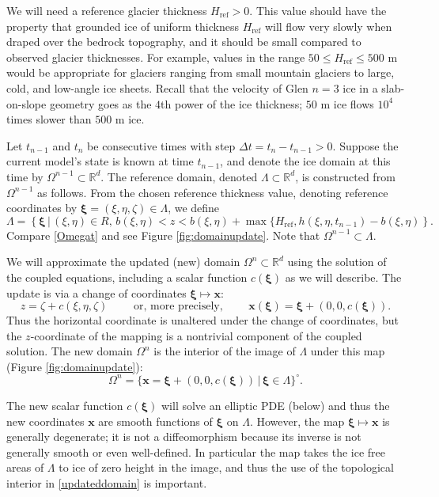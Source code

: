 \documentclass[letterpaper,final,12pt,reqno]{amsart}
\newcommand{\RR}{\mathbb{R}}
\newcommand{\bx}{\mathbf{x}}
\newcommand{\bxi}{\bm{\xi}}
\newcommand{\Href}{H_{\text{ref}}}
\begin{document}
We will need a reference glacier thickness $\Href>0$.  This value should have the property that grounded ice of uniform thickness $\Href$ will flow very slowly when draped over the bedrock topography, and it should be small compared to observed glacier thicknesses.  For example, values in the range $50 \le \Href \le 500$ m would be appropriate for glaciers ranging from small mountain glaciers to large, cold, and low-angle ice sheets.  Recall that the velocity of Glen $n=3$ ice in a slab-on-slope geometry \cite{GreveBlatter2009} goes as the $4$th power of the ice thickness; $50$ m ice flows $10^4$ times slower than $500$ m ice.

Let $t_{n-1}$ and $t_n$ be consecutive times with step $\Delta t = t_n - t_{n-1} > 0$.  Suppose the current model's state is known at time $t_{n-1}$, and denote the ice domain at this time by $\Omega^{n-1} \subset \RR^d$.  The reference domain, denoted $\Lambda \subset \RR^d$, is constructed from $\Omega^{n-1}$ as follows.  From the chosen reference thickness value, denoting reference coordinates by $\bxi=(\xi,\eta,\zeta) \in \Lambda$, we define
\begin{equation}
\Lambda = \left\{\bxi\,\big|\,(\xi,\eta)\in R, \, b(\xi,\eta) < z < b(\xi,\eta) + \max\{\Href,h(\xi,\eta,t_{n-1})-b(\xi,\eta)\right\}.  \label{Lambda}
\end{equation}
Compare \eqref{Omegat} and see Figure \ref{fig:domainupdate}.  Note that $\Omega^{n-1} \subset \Lambda$.

We will approximate the updated (new) domain $\Omega^n \subset \RR^d$ using the solution of the coupled equations, including a scalar function $c(\bxi)$ as we will describe.  The update is via a change of coordinates $\bxi \mapsto \bx$:
\begin{equation}
z=\zeta+c(\xi,\eta,\zeta) \qquad \text{ or, more precisely, } \qquad \bx(\bxi) = \bxi + (0,0,c(\bxi)). \label{changecoords}
\end{equation}
Thus the horizontal coordinate is unaltered under the change of coordinates, but the $z$-coordinate of the mapping is a nontrivial component of the coupled solution.  The new domain $\Omega^n$ is the interior of the image of $\Lambda$ under this map (Figure \ref{fig:domainupdate}):
\begin{equation}
\Omega^n = \{\bx=\bxi + (0,0,c(\bxi)) \,\big|\, \bxi \in \Lambda\}^\circ. \label{updateddomain}
\end{equation}

The new scalar function $c(\bxi)$ will solve an elliptic PDE (below) and thus the new coordinates $\bx$ are smooth functions of $\bxi$ on $\Lambda$.  However, the map $\bxi \mapsto \bx$ is generally degenerate; it is not a diffeomorphism because its inverse is not generally smooth or even well-defined.  In particular the map takes the ice free areas of $\Lambda$ to ice of zero height in the image, and thus the use of the topological interior in \eqref{updateddomain} is important.
\end{document}
